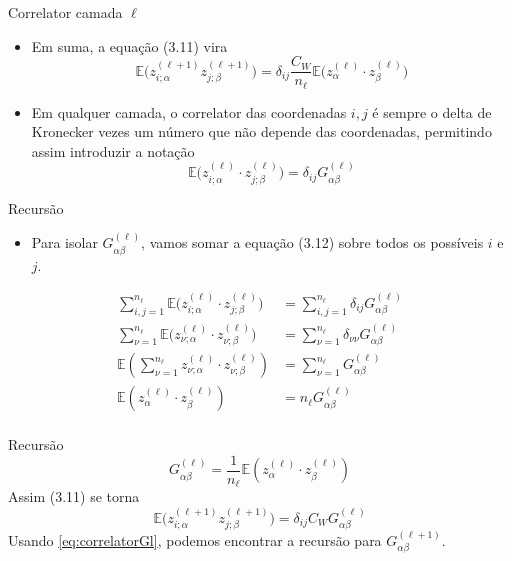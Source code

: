 \documentclass{beamer}
\newcommand{\EE}{\mathbb{E}}
\newcommand{\aaA}{\alpha}
\newcommand{\aaB}{\beta}
\begin{document}
\begin{frame}{Correlator camada $\ell$}
	\begin{itemize}
		\item Em suma, a equação (3.11) vira 
		 $$\EE\big(z^{(\ell +1)}_{i;\aaA} z^{(\ell +1)}_{j;\aaB}\big) = \delta_{ij}\frac{C_W}{n_\ell} \EE\big(z^{(\ell)}_{\aaA}\cdot  z^{(\ell)}_{\aaB}\big)$$
		 \item Em qualquer camada, o correlator das coordenadas $i,j$ é sempre o delta de Kronecker vezes um número que não depende das coordenadas, permitindo assim introduzir a notação 
		 \begin{equation*}\tag{3.12}
			\EE\big(z^{(\ell)}_{i;\aaA}\cdot z^{(\ell)}_{j;\aaB}\big) = \delta_{ij} G^{(\ell)}_{\aaA\aaB}  
		 \end{equation*}
	\end{itemize}
\end{frame}

\begin{frame}{Recursão}
	\begin{itemize}
		\item Para isolar $G^{(\ell)}_{\aaA\aaB}$, vamos somar a equação (3.12) sobre todos os possíveis $i$ e $j$.
	\end{itemize}
	\begin{align*}
		\sum_{i,j=1}^{n_\ell} \EE\big(z^{(\ell)}_{i;\aaA}\cdot z^{(\ell)}_{j;\aaB}\big) &= \sum_{i,j=1}^{n_\ell} \delta_{ij} G^{(\ell)}_{\aaA\aaB} \\
		\sum_{\nu=1}^{n_\ell} \EE\big(z^{(\ell)}_{\nu;\aaA}\cdot z^{(\ell)}_{\nu;\aaB}\big) &= \sum_{\nu=1}^{n_\ell} \delta_{\nu\nu}G^{(\ell)}_{\aaA\aaB} \\
		\EE\left(\sum_{\nu=1}^{n_\ell}z^{(\ell)}_{\nu;\aaA}\cdot z^{(\ell)}_{\nu;\aaB}\right) &= \sum_{\nu=1}^{n_\ell} G^{(\ell)}_{\aaA\aaB} \\
		\EE(z^{(\ell)}_{\aaA}\cdot z^{(\ell)}_{\aaB}) &= n_\ell G^{(\ell)}_{\aaA\aaB} \\
	\end{align*}
\end{frame}

\begin{frame}{Recursão}
	\begin{equation*}\tag{3.13}
		G^{(\ell)}_{\aaA\aaB} = \frac{1}{n_\ell}\EE(z^{(\ell)}_{\aaA}\cdot z^{(\ell)}_{\aaB})		
	\end{equation*}
	Assim (3.11) se torna
	\begin{equation*}\tag{3.11'}\label{eq:correlatorGl}
		\EE\big(z^{(\ell +1)}_{i;\aaA} z^{(\ell +1)}_{j;\aaB}\big) = \delta_{ij}C_WG^{(\ell)}_{\aaA\aaB}
	\end{equation*}
	Usando \eqref{eq:correlatorGl}, podemos encontrar a recursão para $G^{(\ell+1)}_{\aaA\aaB}$.
\end{frame}
\end{document}
